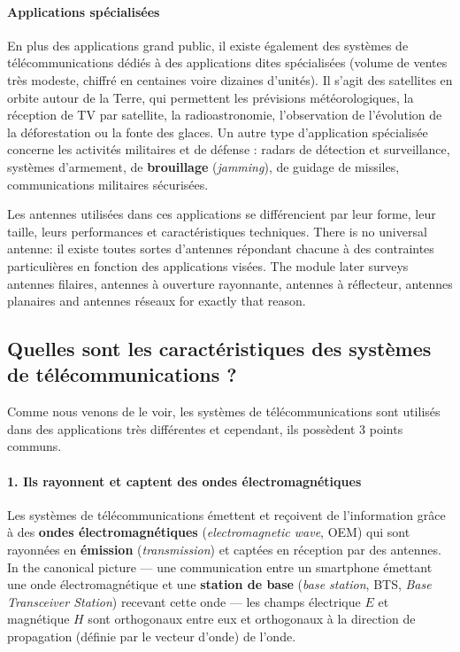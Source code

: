 \paragraph{Applications spécialisées} En plus des applications grand public, il
existe également des systèmes de télécommunications dédiés à des applications
dites spécialisées (volume de ventes très modeste, chiffré en centaines voire
dizaines d'unités). Il s'agit des satellites en orbite autour de la Terre, qui
permettent les prévisions météorologiques, la réception de TV par satellite, la
radioastronomie, l'observation de l'évolution de la déforestation ou la fonte
des glaces. Un autre type d'application spécialisée concerne les activités
militaires et de défense : radars de détection et surveillance, systèmes
d'armement, de \textbf{brouillage} (\textit{jamming}), de guidage de missiles,
communications militaires sécurisées.

\begin{remark}
  Les antennes utilisées dans ces applications se différencient par leur forme,
  leur taille, leurs performances et caractéristiques techniques. There is no
  universal antenne: il existe toutes sortes d'antennes répondant chacune à des
  contraintes particulières en fonction des applications visées. The module
  later surveys antennes filaires, antennes à ouverture rayonnante, antennes à
  réflecteur, antennes planaires and antennes réseaux for exactly that reason.
\end{remark}

\subsection{Quelles sont les caractéristiques des systèmes de télécommunications ?}
Comme nous venons de le voir, les systèmes de télécommunications sont utilisés
dans des applications très différentes et cependant, ils possèdent 3 points
communs.

\paragraph{1. Ils rayonnent et captent des ondes électromagnétiques}
Les systèmes de télécommunications émettent et reçoivent de l'information grâce
à des \textbf{ondes électromagnétiques} (\textit{electromagnetic wave}, OEM) qui
sont rayonnées en \textbf{émission}
(\textit{transmission}) et captées en réception par des antennes.
In the canonical picture --- une communication entre un smartphone émettant une
onde électromagnétique et une \textbf{station de base} (\textit{base station},
BTS, \textit{Base Transceiver Station}) recevant cette onde --- les champs
électrique $E$ et magnétique $H$ sont orthogonaux entre eux et orthogonaux à
la direction de propagation (définie par le vecteur d'onde) de l'onde.

